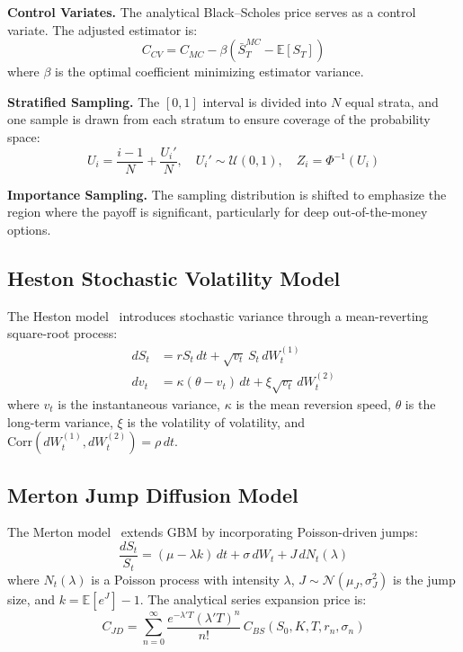 \documentclass[conference]{IEEEtran}
\begin{document}
\textbf{Control Variates.} The analytical Black--Scholes price serves as a control variate. The adjusted estimator is:
\begin{equation}
    C_{CV} = C_{MC} - \beta(\bar{S}_T^{MC} - \mathbb{E}[S_T])
\end{equation}
where $\beta$ is the optimal coefficient minimizing estimator variance.

\textbf{Stratified Sampling.} The $[0,1]$ interval is divided into $N$ equal strata, and one sample is drawn from each stratum to ensure coverage of the probability space:
\begin{equation}
    U_i = \frac{i-1}{N} + \frac{U_i'}{N}, \quad U_i' \sim \mathcal{U}(0,1), \quad Z_i = \Phi^{-1}(U_i)
\end{equation}

\textbf{Importance Sampling.} The sampling distribution is shifted to emphasize the region where the payoff is significant, particularly for deep out-of-the-money options.

\subsection{Heston Stochastic Volatility Model}

The Heston model~\cite{b18} introduces stochastic variance through a mean-reverting square-root process:
\begin{align}
    dS_t &= rS_t \, dt + \sqrt{v_t} \, S_t \, dW_t^{(1)} \label{eq:heston_price} \\
    dv_t &= \kappa(\theta - v_t) \, dt + \xi\sqrt{v_t} \, dW_t^{(2)} \label{eq:heston_vol}
\end{align}
where $v_t$ is the instantaneous variance, $\kappa$ is the mean reversion speed, $\theta$ is the long-term variance, $\xi$ is the volatility of volatility, and $\text{Corr}(dW_t^{(1)}, dW_t^{(2)}) = \rho \, dt$.

\subsection{Merton Jump Diffusion Model}

The Merton model~\cite{b2} extends GBM by incorporating Poisson-driven jumps:
\begin{equation}\label{eq:merton}
    \frac{dS_t}{S_t} = (\mu - \lambda k) \, dt + \sigma \, dW_t + J \, dN_t(\lambda)
\end{equation}
where $N_t(\lambda)$ is a Poisson process with intensity $\lambda$, $J \sim \mathcal{N}(\mu_J, \sigma_J^2)$ is the jump size, and $k = \mathbb{E}[e^J] - 1$. The analytical series expansion price is:
\begin{equation}
    C_{JD} = \sum_{n=0}^{\infty} \frac{e^{-\lambda'T}(\lambda'T)^n}{n!} \, C_{BS}(S_0, K, T, r_n, \sigma_n)
\end{equation}
\end{document}
